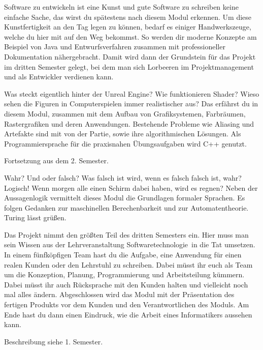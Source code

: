 Software zu entwickeln ist eine Kunst und gute Software zu schreiben keine einfache Sache, das wirst du spätestens nach diesem Modul erkennen.
Um diese Kunstfertigkeit an den Tag legen zu können, bedarf es einiger Handwerkszeuge, welche du hier mit auf den Weg bekommst.
So werden dir moderne Konzepte am Beispiel von Java und Entwurfsverfahren zusammen mit professioneller Dokumentation nähergebracht.
Damit wird dann der Grundstein für das Projekt im dritten Semester gelegt, bei dem man sich Lorbeeren im Projektmanagement und als Entwickler verdienen kann.

Was steckt eigentlich hinter der Unreal Engine? Wie funktionieren Shader? 
Wieso sehen die Figuren in Computerspielen immer realistischer aus?
Das erfährst du in diesem Modul, zusammen mit dem Aufbau von Grafiksystemen, Farbräumen, Rastergrafiken und deren Anwendungen.
Bestehende Probleme wie Aliasing und Artefakte sind mit von der Partie, sowie ihre algorithmischen Lösungen.
Als Programmiersprache für die praxisnahen Übungsaufgaben wird C++ genutzt.


Fortsetzung aus dem 2. Semester.

Wahr?
Und oder falsch?
Was falsch ist wird, wenn es falsch falsch ist, wahr?
Logisch!
Wenn morgen alle einen Schirm dabei haben, wird es regnen?
Neben der Aussagenlogik vermittelt dieses Modul die Grundlagen formaler Sprachen.
Es folgen Gedanken zur maschinellen Berechenbarkeit und zur Automatentheorie.
Turing lässt grüßen.

\newpage

Das Projekt nimmt den größten Teil des dritten Semesters ein.
Hier muss man sein Wissen aus der Lehrveranstaltung \glqq Softwaretechnologie\grqq\ in die Tat umsetzen.
In einem fünfköpfigen Team hast du die Aufgabe, eine Anwendung für einen realen Kunden oder den Lehrstuhl zu schreiben.
Dabei müsst ihr euch als Team um die Konzeption, Planung, Programmierung und Arbeitsteilung kümmern.
Dabei müsst ihr auch Rücksprache mit den Kunden halten und vielleicht noch mal alles ändern.
Abgeschlossen wird das Modul mit der Präsentation des fertigen Produkts vor dem Kunden und den Verantwortlichen des Moduls.
Am Ende hast du dann einen Eindruck, wie die Arbeit eines Informatikers aussehen kann.

Beschreibung siehe 1. Semester.

